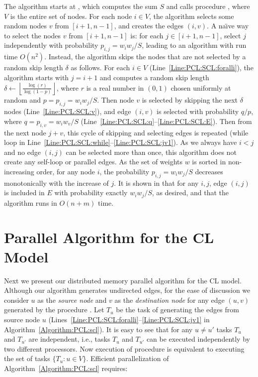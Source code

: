 \documentclass[conference,letterpaper,10pt]{IEEEtran}
\begin{document}
The algorithm starts at  , which computes the sum $S$ and calls procedure , where $V$ is the entire set of nodes. For each node $i \in V$, the algorithm selects some random nodes $v$ from $[i+1, n-1]$, and creates the edges $(i, v)$. A na\"{\i}ve way to select the nodes $v$ from $[i+1, n-1]$ is: for each $j \in [i+1, n-1]$, select $j$ independently with probability $p_{i,j}=w_{i}w_{j}/S$, leading to an algorithm with run time $O(n^2)$. Instead, the algorithm skips the nodes that are not selected by a random skip length $\delta$ as follows. 
For each $i \in V$ (Line~\ref{Line:PCL:SCL:foralli}),
the algorithm starts with $j=i+1$ and computes a random skip length $\delta \leftarrow \left\lfloor \frac{\log (r)}{\log (1-p)}\right\rfloor$, where $r$ is a real number in $(0,1)$ chosen uniformly at random and $p = p_{i,j}=w_{i}w_{j}/S$. Then node $v$ is selected by skipping the next $\delta$ nodes (Line~\ref{Line:PCL:SCL:v}), and edge $(i,v)$ is selected with probability $q/p$, where $q = p_{i,v} = w_{i}w_{v}/S$ (Line~\ref{Line:PCL:SCL:q}--\ref{Line:PCL:SCL:E}). Then from the next node $j+v$, this cycle of skipping and selecting edges is repeated (while loop in Line~\ref{Line:PCL:SCL:while}--\ref{Line:PCL:SCL:jv1}). 
As we always have $i<j$ and no edge $(i,j)$ can be selected more than once, this algorithm does not create any self-loop or parallel edges.
As the set of weights $w$ is sorted in non-increasing order, for any node $i$, the probability $p_{i,j} = w_iw_j/S$ decreases monotonically with the increase of $j$. It is shown in \cite{Miller2011} that for any $i, j$, edge $(i,j)$ is included in $E$ with probability exactly $w_iw_j/S$, as desired, and that the algorithm runs in $O(n+m)$ time.

\section{Parallel Algorithm for the CL Model}
\label{Section:TimeEfficient}
Next we present our distributed memory parallel algorithm for the CL model.  Although our algorithm generates undirected edges, for the ease of discussion we consider $u$ as the \emph{source node} and $v$ as the \emph{destination node} for any edge $(u,v)$ generated by the procedure . 
Let $T_u$ be the task of generating the edges from source node $u$ (Lines~\ref{Line:PCL:SCL:foralli}--\ref{Line:PCL:SCL:jv1} in Algorithm~\ref{Algorithm:PCL:scl}). It is easy to see that for any $u \ne u'$ tasks $T_u$ and $T_{u'}$ are independent, i.e., tasks $T_u$ and $T_{u'}$ can be executed independently by two different processors. Now execution of procedure  is equivalent to executing the set of tasks $\{T_u:u \in V\}$.  Efficient parallelization of Algorithm~\ref{Algorithm:PCL:scl} requires:
\end{document}
